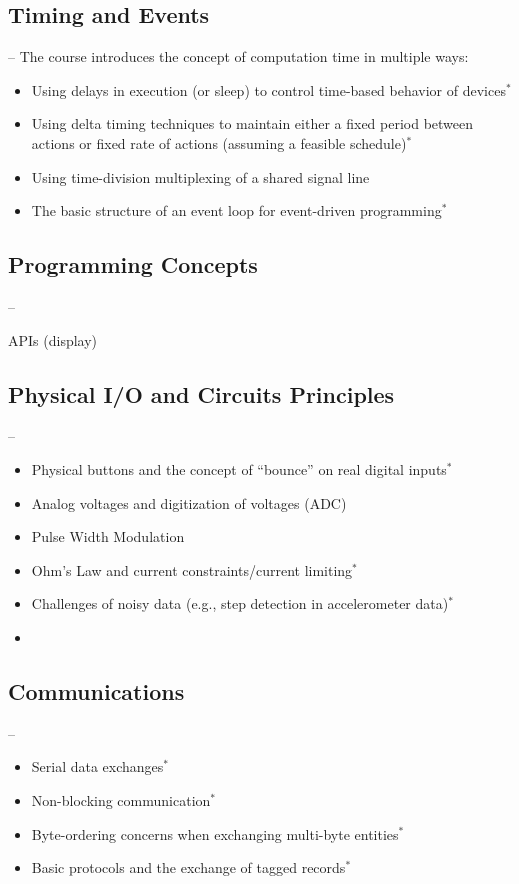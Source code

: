 \subsection{Timing and Events} --
\label{sec:time}
The course introduces the concept of computation time in multiple ways:
\begin{itemize}
  \item Using delays in execution (or sleep) to control time-based behavior of devices$^*$
  \item Using delta timing techniques to maintain either a fixed period between actions or fixed rate of actions (assuming a feasible schedule)$^*$
  \item Using time-division multiplexing of a shared signal line
  \item The basic structure of an event loop for event-driven programming$^*$
\end{itemize}

\subsection{Programming Concepts} --
\label{sec:time}

APIs (display)

\subsection{Physical I/O and Circuits Principles} --
\label{sec:pio}
\begin{itemize}
  \item Physical buttons and the concept of ``bounce'' on real digital inputs$^*$
  \item Analog voltages and digitization of voltages (ADC)
  \item Pulse Width Modulation
  \item Ohm's Law and current constraints/current limiting$^*$
  \item Challenges of noisy data (e.g., step detection in accelerometer data)$^*$
  \item
\end{itemize}

\subsection{Communications} --
\label{sec:comm}
\begin{itemize}
  \item Serial data exchanges$^*$
  \item Non-blocking communication$^*$
  \item Byte-ordering concerns when exchanging multi-byte entities$^*$
  \item Basic protocols and the exchange of tagged records$^*$
\end{itemize}

